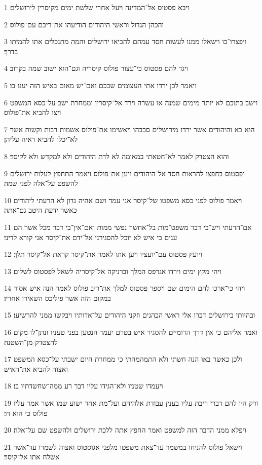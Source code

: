 \par 1 ויבא פסטוס אל־המדינה ויעל אחרי שלשת ימים מקיסרין לירושלים׃
\par 2 והכהן הגדול וראשי היהודים הודיעהו את־ריבם עם־פולוס׃
\par 3 ויפצרו־בו וישאלו ממנו לעשות חסד עמהם להביאו ירושלים והמה מתנכלים אתו להמיתו בדרך׃
\par 4 ויגד להם פסטוס כי־עצור פולוס קיסריה וגם־הוא ישוב שמה בקרוב׃
\par 5 ויאמר לכן ירדו אתי העצומים שבכם ואם־יש מאום באיש הזה יענו בו׃
\par 6 וישב בתוכם לא יותר מימים שמנה או עשרה וירד אל־קיסרין וממחרת ישב על־כסא המשפט ויצו להביא את־פולוס׃
\par 7 הוא בא והיהודים אשר ירדו מירושלים סבבהו ויאשימו את־פולוס אשמות רבות וקשות אשר לא־יכלו להביא ראיה עליהן׃
\par 8 והוא הצטדק לאמר לא־חטאתי במאומה לא לדת היהודים ולא למקדש ולא לקיסר׃
\par 9 ופסטוס בחפצו להראות חסד אל־היהודים ויען את־פולוס ויאמר התחפץ לעלות ירושלים להשפט על־אלה לפני שמה׃
\par 10 ויאמר פולוס לפני כסא משפטו של־קיסר אני עמד ושם אהיה נדון לא הרעתי ליהודים כאשר ידעת היטב גם־אתה׃
\par 11 אם־הרעתי ויש־בי דבר משפט־מות בל־אחשך נפשי ממות ואם־אין־בי דבר מכל אשר הם ענים בי איש לא יוכל להסגירני אל־ידם את־קיסר אני קורא לדיני׃
\par 12 ויועץ פסטוס עם־יועציו ויען אתו לאמר את־קיסר קראת אל־קיסר תלך׃
\par 13 ויהי מקץ ימים וירדו אגרפס המלך וברניקה אל־קיסריה לשאל לפסטוס לשלום׃
\par 14 ויהי כי־ארכו להם הימים שם ויספר פסטוס למלך את־ריב פולוס לאמר הנה איש אסור במקום הזה אשר פיליכס השאירו אחריו׃
\par 15 ובהיותי בירושלים דברו אלי ראשי הכהנים וזקני היהודים על־אדותיו ויבקשו ממני להרשיעו׃
\par 16 ואמר אליהם כי אין דרך הרומיים להסגיר איש בטרם יעמד הנטען בפני טעניו ונתן־לו מקום להצטדק מן־השטנה׃
\par 17 ולכן כאשר באו הנה חשתי ולא התמהמהתי כי ממחרת היום ישבתי על־כסא המשפט ואצוה להביא את־האיש׃
\par 18 ויעמדו שטניו ולא־הגידו עליו דבר רע ממה־שחשדתיו בו׃
\par 19 ורק היו להם דברי ריבת עליו בענין עבודת אלהיהם ועל־מת אחד ישוע שמו אשר אמר עליו פולוס כי הוא חי׃
\par 20 ויפלא ממני הדבר הזה למשפט ואמר החפץ אתה ללכת ירושלים ולהשפט שם על־אלה׃
\par 21 וישאל פולוס להניחו במשמר עד־צאת משפטו מלפני אגוסטוס ואצוה לשמרו עד־אשר אשלח אתו אל־קיסר׃
